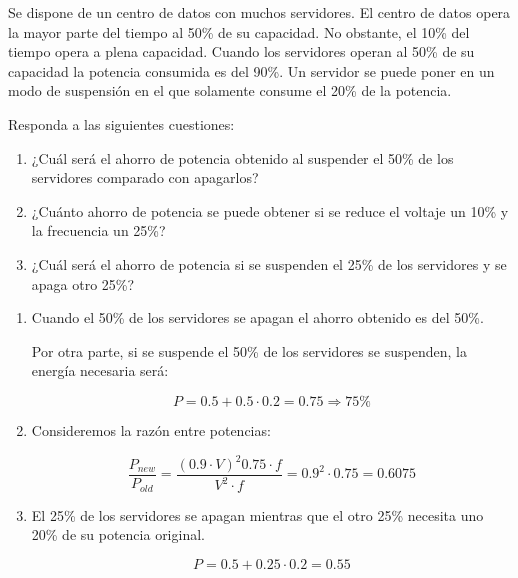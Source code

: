 \begin{acexercise}\end{acexercise}

Se dispone de un centro de datos con muchos servidores. El centro de datos opera
la mayor parte del tiempo al 50\% de su capacidad. No obstante, el 10\% del tiempo
opera a plena capacidad. Cuando los servidores operan al 50\% de su capacidad la
potencia consumida es del 90\%. Un servidor se puede poner en un modo de suspensión
en el que solamente consume el 20\% de la potencia.

Responda a las siguientes cuestiones:

\begin{enumerate}

\item ¿Cuál será el ahorro de potencia obtenido al suspender el 50\% de los
servidores comparado con apagarlos?

\item ¿Cuánto ahorro de potencia se puede obtener si se reduce el voltaje un
10\% y la frecuencia un 25\%?

\item ¿Cuál será el ahorro de potencia si se suspenden el 25\% de los servidores
y se apaga otro 25\%?

\end{enumerate}


\begin{acsolution}\end{acsolution}

\begin{enumerate}

\item Cuando el 50\% de los servidores se apagan el ahorro obtenido es del 50\%.

Por otra parte, si se suspende el 50\% de los servidores se suspenden, la energía 
necesaria será:

\[P = 0.5 + 0.5 \cdot 0.2 = 0.75 \Rightarrow 75\%\]

\item Consideremos la razón entre potencias:

\[
\frac{P_{new}}{P_{old}} =
\frac{(0.9 \cdot V)^2 0.75 \cdot f}{V^2 \cdot f} =
0.9^2 \cdot 0.75 =
0.6075
\]

\item El 25\% de los servidores se apagan mientras que el otro 25\%
necesita uno 20\% de su potencia original.

\[
P = 0.5 + 0.25 \cdot 0.2 = 0.55
\]

\end{enumerate}

